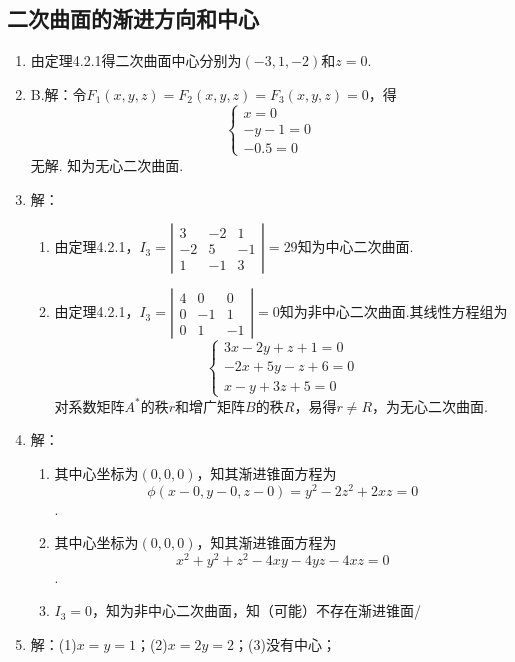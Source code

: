 \documentclass[UTF8]{ctexart}
\begin{document}
\subsection{二次曲面的渐进方向和中心}
\begin{enumerate}
\item 由定理4.2.1得二次曲面中心分别为$(-3,1,-2)$和$z=0$.

\item B.解：令$F_1(x,y,z)=F_2(x,y,z)=F_3(x,y,z)=0$，得
$$\left\{\begin{array}{l}x=0\\-y-1=0\\-0.5=0\end{array}\right.$$无解. 知为无心二次曲面. 

\item 解：\begin{enumerate}[(1)]
\item 由定理4.2.1，$I_3=\left|\begin{array}{ccc}3&-2&1\\-2&5&-1\\1&-1&3\end{array}\right|=29$知为中心二次曲面.
\item 由定理4.2.1，$I_3=\left|\begin{array}{ccc}4&0&0\\0&-1&1\\0&1&-1\end{array}\right|=0$知为非中心二次曲面.其线性方程组为
$$\left\{\begin{array}{l}3x-2y+z+1=0\\-2x+5y-z+6=0\\x-y+3z+5=0\end{array}\right.$$
对系数矩阵$A^*$的秩$r$和增广矩阵$B$的秩$R$，易得$r\neq R$，为无心二次曲面.
\end{enumerate}

\item 解：\begin{enumerate}[(1)]
\item 其中心坐标为$(0,0,0)$，知其渐进锥面方程为
$$\phi(x-0,y-0,z-0)=y^2-2z^2+2xz=0$$.
\item 其中心坐标为$(0,0,0)$，知其渐进锥面方程为
$$x^2+y^2+z^2-4xy-4yz-4xz=0$$.
\item $I_3=0$，知为非中心二次曲面，知（可能）不存在渐进锥面/
\end{enumerate}

\item 解：(1)$x=y=1$；(2)$x=2y=2$；(3)没有中心；


\end{enumerate}
\end{document}

